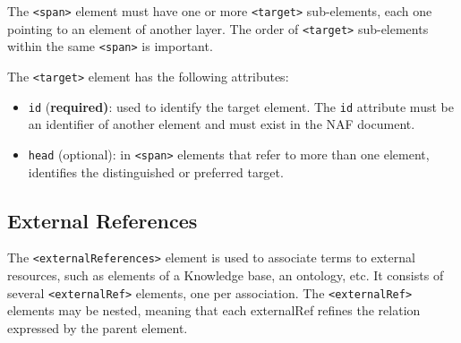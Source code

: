 \noindent The \texttt{<span>} element must have one or more
\texttt{<target>} sub-elements, each one pointing to an element of another
layer. The order of \texttt{<target>} sub-elements within the same
\texttt{<span>} is important.

\noindent The \texttt{<target>} element has the following attributes:
\begin{itemize}
\item \texttt{id} (\textbf{required)}: used to identify the target
  element. The \texttt{id} attribute must be an identifier of another
  element and must exist in the NAF document.
\item \texttt{head} (optional): in \texttt{<span>} elements that refer to
  more than one element, identifies the distinguished or preferred target.
\end{itemize}


\subsection{External References}
\label{sec:external-references}

The \texttt{<externalReferences>} element is used to associate terms to
external resources, such as elements of a Knowledge base, an ontology,
etc. It consists of several \texttt{<externalRef>} elements, one per
association. The \texttt{<externalRef>} elements may be nested, meaning that
each externalRef refines the relation expressed by the parent element.\\

